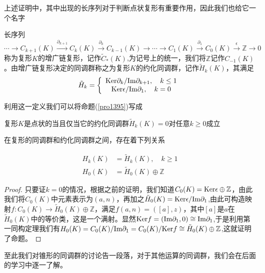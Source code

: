 上述证明中，其中出现的长序列对于判断点状复形有重要作用，因此我们也给它一个名字
\begin{definition}
长序列\begin{equation*}
    \cdots \rightarrow C_{k+1}(K)\xrightarrow{\partial_{k+1}}C_{k}(K)\xrightarrow{\partial_{k}}C_{k-1}(K)\rightarrow\cdots\rightarrow C_{1}(K)\xrightarrow{\partial_{1}}C_{0}(K)\xrightarrow{\epsilon}\mathbb{Z}\rightarrow 0
\end{equation*}
称为复形$K$的增广链复形，记作$\tilde{C}_{*}(K)$,为记号上的统一，我们将$\mathbb{Z}$记作$C_{-1}(K)$。由增广链复形决定的同调群称之为复形$K$的约化同调群，记作$\tilde{H}_{k}(K)$，其满足
\begin{equation*}
    \tilde{H}_{k}=\left\{\begin{array}{cc}
         {\rm Ker}\partial_{k}/{\rm Im}\partial_{k+1},\quad k\leq1  \\
         {\rm Ker}\epsilon/{\rm Im}\partial_{1},\quad k=0
    \end{array}\right.
\end{equation*}
\end{definition}
利用这一定义我们可以将命题(\ref{pro1395})写成
\begin{proposition}
复形$K$是点状的当且仅当它的约化同调群$\tilde{H}_{k}(K)=0$对任意$k\geq 0$成立
\end{proposition}
在复形的同调群和约化同调群之间，存在着下列关系
\begin{proposition}\label{chap1_pro_1431}
\begin{equation*}
\begin{aligned}
H_{k}(K)&=\tilde{H}_{k}(K),\quad k\geq 1\\
H_{0}(K)&=\tilde{H}_{0}(K)\oplus \mathbb{Z}
\end{aligned}
\end{equation*}
\end{proposition}
\begin{proof}
只要证$k=0$的情况，根据之前的证明，我们知道$C_{0}(K)={\rm Ker}\epsilon\oplus\mathbb{Z}$，由此我们将$C_{0}(K)$中元素表示为$(a,n)$，再加之$\tilde{H}_{0}(K)={\rm Ker}\epsilon/{\rm Im}\partial_{1}$,由此可构造映射$f:C_{0}(K)\rightarrow \tilde{H}_{0}(K)\oplus\mathbb{Z}$，满足$f(a,n)=([a],z)$，其中$[a]$是$a$在$\tilde{H}_{0}(K)$中的等价类，这是一个满射。显然${\rm Ker} f=({\rm Im}\partial_{1},0)\cong{\rm Im}\partial_{1}$,于是利用第一同构定理我们有$H_{0}(K)=C_{0}(K)/{\rm Im}\partial_{1}=C_{0}(K)/{\rm Ker} f\cong\tilde{H}_{0}(K)\oplus \mathbb{Z}$,这就证明了命题。
\end{proof}
至此我们对锥形的同调群的讨论告一段落，对于其他运算的同调群，我们会在后面的学习中逐一了解。
